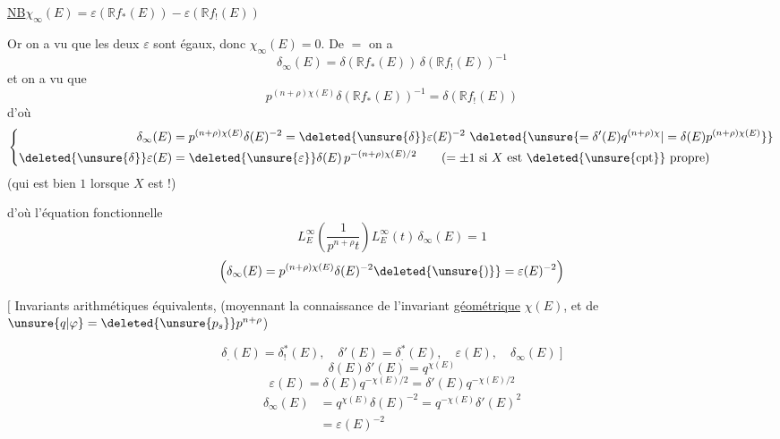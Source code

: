 \uline{NB}\quad $\chi_\infty(E)=\varepsilon(\mathbb R f_*(E))-\varepsilon(\mathbb R f_!(E))$

Or on a vu que les deux $\varepsilon$ sont égaux, donc $\chi_\infty(E)=0$. De $=$ on a
\[
\delta_\infty(E)=\delta(\mathbb R f_*(E))\,\delta(\mathbb R f_!(E))^{-1}
\]
et on a vu que
\[
p^{(n+\rho)\chi(E)}\delta(\mathbb R f_*(E))^{-1}=\delta(\mathbb R f_!(E))
\]
d'où
\[
\left\{\begin{aligned}
\delta_\infty(E)&=p^{(n+\rho)\chi(E)}\delta(E)^{-2}
 =\deleted{\unsure{\delta}}\varepsilon(E)^{-2}\ \deleted{\unsure{=\delta'(E)q^{(n+\rho)\chi}|=\delta(E)p^{(n+\rho)\chi(E)}}}\\
\deleted{\unsure{\delta}}\varepsilon(E)&=\deleted{\unsure{\varepsilon}}\delta(E)\,p^{-(n+\rho)\chi(E)/2}
 \qquad (=\pm1\ \text{si $X$ est \deleted{\unsure{cpt}} propre})
\end{aligned}\right.
\]
(qui est bien $1$ lorsque $X$ est  !)

d'où l'équation fonctionnelle
\[
\boxed{L_E^\infty\left(\frac{1}{p^{n+\rho}t}\right)L_E^\infty(t)\,\delta_\infty(E)=1}
\]
\[
\left(\delta_\infty(E)=p^{(n+\rho)\chi(E)}\delta(E)^{-2}\deleted{\unsure{)}}=\varepsilon(E)^{-2}\right)
\]

$\bigl[$ Invariants arithmétiques équivalents, (moyennant la connaissance de l'invariant \uline{géométrique} $\chi(E)$, et de $\unsure{q|\varphi}=\deleted{\unsure{p_s}}p^{n+\rho}$)

\[
\delta_{.}(E)=\delta_!^*(E),\quad \delta'(E)=\delta_{.}^*(E),\quad \varepsilon(E),\quad \delta_\infty(E)\ \biggr]
\]
\[
\boxed{\delta(E)\delta'(E)=q^{\chi(E)}}
\]
\[
\boxed{\varepsilon(E)=\delta(E)q^{-\chi(E)/2}=\delta'(E)q^{-\chi(E)/2}}
\]
\[
\boxed{\begin{aligned}
\delta_\infty(E)&=q^{\chi(E)}\delta(E)^{-2}=q^{-\chi(E)}\delta'(E)^2\\
&=\varepsilon(E)^{-2}
\end{aligned}}
\]

